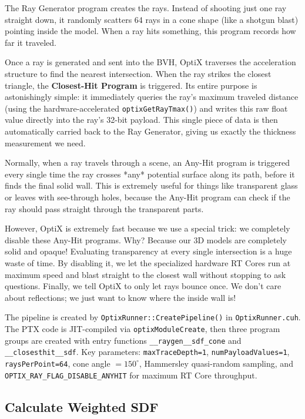The Ray Generator program creates the rays. Instead of shooting just one ray straight down, it randomly scatters 64 rays in a cone shape (like a shotgun blast) pointing inside the model. When a ray hits something, this program records how far it traveled.


Once a ray is generated and sent into the BVH, OptiX traverses the acceleration structure to find the nearest intersection. When the ray strikes the closest triangle, the \textbf{Closest-Hit Program} is triggered. Its entire purpose is astonishingly simple: it immediately queries the ray's maximum traveled distance (using the hardware-accelerated \texttt{optixGetRayTmax()}) and writes this raw float value directly into the ray's 32-bit payload. This single piece of data is then automatically carried back to the Ray Generator, giving us exactly the thickness measurement we need.

Normally, when a ray travels through a scene, an Any-Hit program is triggered every single time the ray crosses *any* potential surface along its path, before it finds the final solid wall. This is extremely useful for things like transparent glass or leaves with see-through holes, because the Any-Hit program can check if the ray should pass straight through the transparent parts. 

However, OptiX is extremely fast because we use a special trick: we completely disable these Any-Hit programs. Why? Because our 3D models are completely solid and opaque! Evaluating transparency at every single intersection is a huge waste of time. By disabling it, we let the specialized hardware RT Cores run at maximum speed and blast straight to the closest wall without stopping to ask questions. Finally, we tell OptiX to only let rays bounce once. We don't care about reflections; we just want to know where the inside wall is!

The pipeline is created by \texttt{OptixRunner::CreatePipeline()} in \texttt{OptixRunner.cuh}. The PTX code is JIT-compiled via \texttt{optixModuleCreate}, then three program groups are created with entry functions \texttt{\_\_raygen\_\_sdf\_cone} and \texttt{\_\_closesthit\_\_sdf}. Key parameters: \texttt{maxTraceDepth=1}, \texttt{numPayloadValues=1}, \texttt{raysPerPoint=64}, cone angle $= 150^\circ$, Hammersley quasi-random sampling, and \texttt{OPTIX\_RAY\_FLAG\_DISABLE\_ANYHIT} for maximum RT Core throughput.

\subsection{Calculate Weighted SDF}

